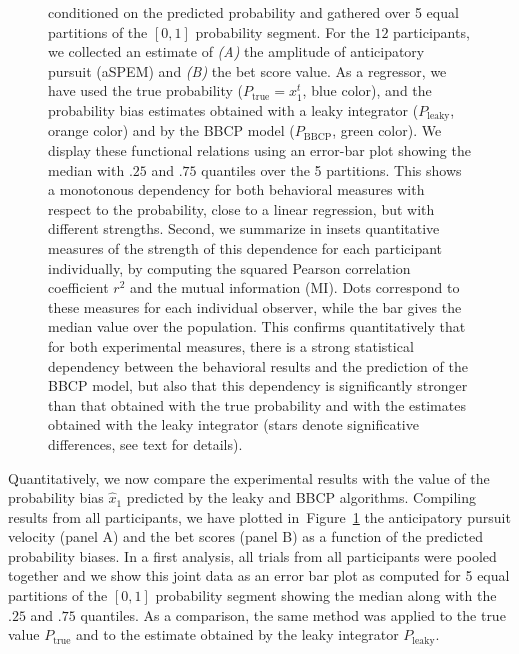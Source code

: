 \documentclass[10pt,letterpaper]{article}
\newcommand{\seeFig}[1]{Figure~\ref{fig:#1}}
\begin{document}
\begin{figure}
{conditioned on the predicted probability and
gathered over 5 equal partitions of the $[0, 1]$ probability segment.
For the $12$ participants, we collected an estimate of
\textit{(A)} the amplitude of anticipatory pursuit (aSPEM)
and \textit{(B)} the bet score value.
As a regressor, we have used the true probability ($P_{\text{true}}=x_1^t$, blue color),
and the probability bias estimates obtained with a leaky integrator ($P_{\text{leaky}}$, orange color)
and by the BBCP model ($P_{\text{BBCP}}$, green color).
We display these functional relations
using an error-bar plot showing the median with $.25$ and $.75$ quantiles
over the 5 partitions.
This shows a monotonous dependency for both behavioral measures with respect to the probability,
close to a linear regression, but with different strengths.
Second, we summarize in insets  quantitative measures of the strength of this dependence for each participant individually,
by computing the squared Pearson correlation coefficient $r^2$
and the mutual information (MI).
Dots correspond to these measures for each individual observer,
while the bar gives the median value over the population.
This confirms quantitatively that for both experimental measures,
there is a strong statistical dependency between
the behavioral results and the prediction of the BBCP model,
but also that this dependency is significantly stronger than that obtained
with the true probability and with the estimates obtained with the leaky integrator
(stars denote significative differences, see text for details).
}
\label{fig:results_psycho_all}
\end{figure}
Quantitatively, we now compare the experimental results
with the value of the probability bias $\hat{x}_1$
predicted by the leaky and BBCP algorithms.
Compiling results from all participants,
we have plotted in~\seeFig{results_psycho_all}
the anticipatory pursuit velocity (panel A) and the bet scores (panel B)
as a function of the predicted probability biases.
In a first analysis, all trials from all participants were pooled together
and we show this joint data as an error bar plot
as computed for 5 equal partitions of the $[0, 1]$ probability segment
showing the median along with the $.25$ and $.75$ quantiles.
As a comparison, the same method was applied to the true value $P_{\text{true}}$ and
to the estimate obtained by the leaky integrator  $P_{\text{leaky}}$.
\end{document}
